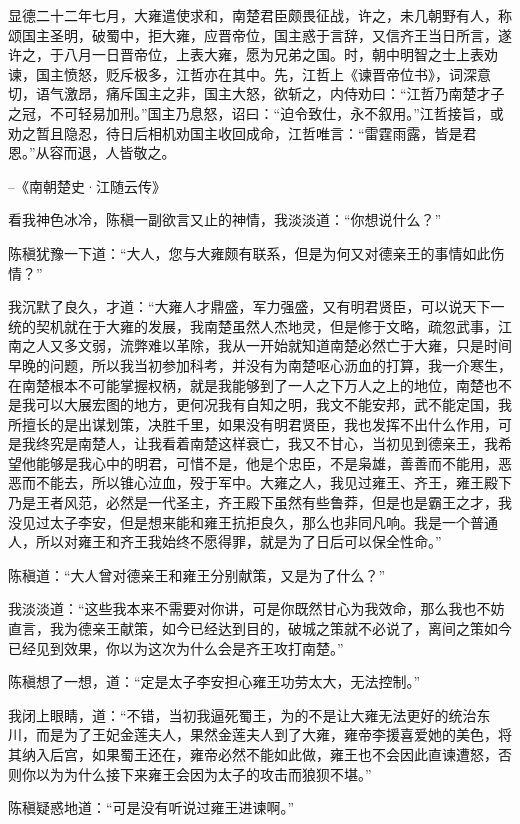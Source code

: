 显德二十二年七月，大雍遣使求和，南楚君臣颇畏征战，许之，未几朝野有人，称颂国主圣明，破蜀中，拒大雍，应晋帝位，国主惑于言辞，又信齐王当日所言，遂许之，于八月一日晋帝位，上表大雍，愿为兄弟之国。时，朝中明智之士上表劝谏，国主愤怒，贬斥极多，江哲亦在其中。先，江哲上《谏晋帝位书》，词深意切，语气激昂，痛斥国主之非，国主大怒，欲斩之，内侍劝曰：“江哲乃南楚才子之冠，不可轻易加刑。”国主乃息怒，诏曰：“迫令致仕，永不叙用。”江哲接旨，或劝之暂且隐忍，待日后相机劝国主收回成命，江哲唯言：“雷霆雨露，皆是君恩。”从容而退，人皆敬之。

--《南朝楚史·江随云传》

看我神色冰冷，陈稹一副欲言又止的神情，我淡淡道：“你想说什么？”

陈稹犹豫一下道：“大人，您与大雍颇有联系，但是为何又对德亲王的事情如此伤情？”

我沉默了良久，才道：“大雍人才鼎盛，军力强盛，又有明君贤臣，可以说天下一统的契机就在于大雍的发展，我南楚虽然人杰地灵，但是修于文略，疏忽武事，江南之人又多文弱，流弊难以革除，我从一开始就知道南楚必然亡于大雍，只是时间早晚的问题，所以我当初参加科考，并没有为南楚呕心沥血的打算，我一介寒生，在南楚根本不可能掌握权柄，就是我能够到了一人之下万人之上的地位，南楚也不是我可以大展宏图的地方，更何况我有自知之明，我文不能安邦，武不能定国，我所擅长的是出谋划策，决胜千里，如果没有明君贤臣，我也发挥不出什么作用，可是我终究是南楚人，让我看着南楚这样衰亡，我又不甘心，当初见到德亲王，我希望他能够是我心中的明君，可惜不是，他是个忠臣，不是枭雄，善善而不能用，恶恶而不能去，所以锥心泣血，殁于军中。大雍之人，我见过雍王、齐王，雍王殿下乃是王者风范，必然是一代圣主，齐王殿下虽然有些鲁莽，但是也是霸王之才，我没见过太子李安，但是想来能和雍王抗拒良久，那么也非同凡响。我是一个普通人，所以对雍王和齐王我始终不愿得罪，就是为了日后可以保全性命。”

陈稹道：“大人曾对德亲王和雍王分别献策，又是为了什么？”

我淡淡道：“这些我本来不需要对你讲，可是你既然甘心为我效命，那么我也不妨直言，我为德亲王献策，如今已经达到目的，破城之策就不必说了，离间之策如今已经见到效果，你以为这次为什么会是齐王攻打南楚。”

陈稹想了一想，道：“定是太子李安担心雍王功劳太大，无法控制。”

我闭上眼睛，道：“不错，当初我逼死蜀王，为的不是让大雍无法更好的统治东川，而是为了王妃金莲夫人，果然金莲夫人到了大雍，雍帝李援喜爱她的美色，将其纳入后宫，如果蜀王还在，雍帝必然不能如此做，雍王也不会因此直谏遭怒，否则你以为为什么接下来雍王会因为太子的攻击而狼狈不堪。”

陈稹疑惑地道：“可是没有听说过雍王进谏啊。”

